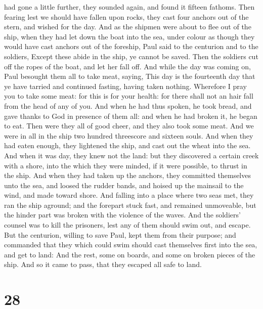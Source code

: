 had gone a little further, they sounded again, and found it fifteen
fathoms.  Then fearing lest we should have fallen upon
rocks, they cast four anchors out of the stern, and wished for the day.
 And as the shipmen were about to flee out of the ship,
when they had let down the boat into the sea, under colour as though
they would have cast anchors out of the foreship,  Paul
said to the centurion and to the soldiers, Except these abide in the
ship, ye cannot be saved.  Then the soldiers cut off the
ropes of the boat, and let her fall off.  And while the
day was coming on, Paul besought them all to take meat, saying, This day
is the fourteenth day that ye have tarried and continued fasting, having
taken nothing.  Wherefore I pray you to take some meat:
for this is for your health: for there shall not an hair fall from the
head of any of you.  And when he had thus spoken, he took
bread, and gave thanks to God in presence of them all: and when he had
broken it, he began to eat.  Then were they all of good
cheer, and they also took some meat.  And we were in all
in the ship two hundred threescore and sixteen souls. 
And when they had eaten enough, they lightened the ship, and cast out
the wheat into the sea.  And when it was day, they knew
not the land: but they discovered a certain creek with a shore, into the
which they were minded, if it were possible, to thrust in the ship.
 And when they had taken up the anchors, they committed
themselves unto the sea, and loosed the rudder bands, and hoised up the
mainsail to the wind, and made toward shore.  And falling
into a place where two seas met, they ran the ship aground; and the
forepart stuck fast, and remained unmoveable, but the hinder part was
broken with the violence of the waves.  And the soldiers'
counsel was to kill the prisoners, lest any of them should swim out, and
escape.  But the centurion, willing to save Paul, kept
them from their purpose; and commanded that they which could swim should
cast themselves first into the sea, and get to land:  And
the rest, some on boards, and some on broken pieces of the ship. And so
it came to pass, that they escaped all safe to land.

\hypertarget{section-27}{%
\section{28}\label{section-27}}

